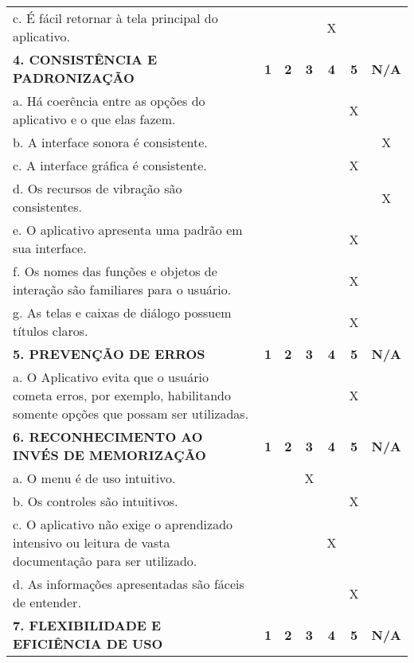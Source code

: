 \documentclass[portuguese,oneside]{tcc}
\begin{document}
\begin{center}
\begin{longtabu}{|L{25em}|c|c|c|c|c|c|}
																		c. É fácil retornar à tela principal do aplicativo. & & & & X & & \\ 
																		\textbf{4. CONSISTÊNCIA E PADRONIZAÇÃO} & \textbf{1} & \textbf{2} & \textbf{3} & \textbf{4} & \textbf{5} & \textbf{N/A} \\ 
																		a. Há coerência entre as opções do aplicativo e o que elas fazem. & & & & & X & \\ 
																		b. A interface sonora é consistente. & & & & & & X \\ 
																		c. A interface gráfica é consistente. & & & & & X & \\ 
																		d. Os recursos de vibração são consistentes. & & & & & & X \\ 
																		e. O aplicativo apresenta uma padrão em sua interface. & & & & & X & \\ 
																		f. Os nomes das funções e objetos de interação são familiares para o usuário. & & & & & X & \\ 
																		g. As telas e caixas de diálogo possuem títulos claros. & & & & & X & \\ 
																		\textbf{5. PREVENÇÃO DE ERROS} & \textbf{1} & \textbf{2} & \textbf{3} & \textbf{4} & \textbf{5} & \textbf{N/A} \\ 
																		a. O Aplicativo evita que o usuário cometa erros, por exemplo, habilitando somente opções que possam ser utilizadas. & & & & & X & \\ 
																		\textbf{6. RECONHECIMENTO AO INVÉS DE MEMORIZAÇÃO} & \textbf{1} & \textbf{2} & \textbf{3} & \textbf{4} & \textbf{5} & \textbf{N/A} \\ 
																		a. O  menu é de uso intuitivo. & & & X & & & \\ 
																		b. Os controles são intuitivos. & & & & & X & \\ 
																		c. O aplicativo não exige o aprendizado intensivo ou leitura de vasta documentação para ser utilizado. & & & & X & & \\ 
																		d. As informações apresentadas são fáceis de entender. & & & & & X & \\ 
																		\textbf{7. FLEXIBILIDADE E EFICIÊNCIA DE USO} & \textbf{1} & \textbf{2} & \textbf{3} & \textbf{4} & \textbf{5} & \textbf{N/A} \\ 

\end{longtabu}
\end{center}
\end{document}
